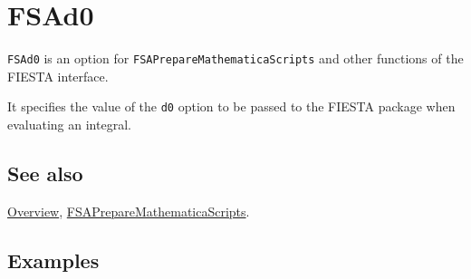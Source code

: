 \documentclass[../FeynHelpersManual.tex]{subfiles}
\begin{document}
\begin{Shaded}
\begin{Highlighting}[]
 
\end{Highlighting}
\end{Shaded}

\hypertarget{fsad0}{
\section{FSAd0}\label{fsad0}}

\texttt{FSAd0} is an option for \texttt{FSAPrepareMathematicaScripts}
and other functions of the FIESTA interface.

It specifies the value of the \texttt{d0} option to be passed to the
FIESTA package when evaluating an integral.

\subsection{See also}

\hyperlink{toc}{Overview},
\hyperlink{fsapreparemathematicascripts}{FSAPrepareMathematicaScripts}.

\subsection{Examples}
\end{document}
